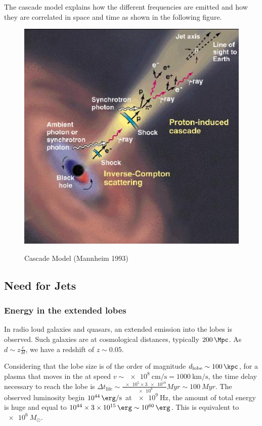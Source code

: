 \documentclass[10pt,a4paper,english]{article}
\begin{document}
The cascade model explains how the different frequencies are emitted and how
they are correlated in space and time as shown in the following figure.

\begin{figure}[!ht]
  \begin{center}
    \includegraphics{figures/Mannheim1993.jpg}
    \label{fig:mannheim1993}
    \caption{Cascade Model (Mannheim 1993)}
  \end{center}
\end{figure}


\subsection{Need for Jets}

\subsubsection{Energy in the extended lobes}

In radio loud galaxies and quasars, an extended emission into the lobes is
observed. Such galaxies are at cosmological distances, typically
$\SI{200}{\Mpc}$. As $d\sim z\frac{c }{H}$, we have a redshift of $z\sim 0.05$.

Considering that the lobe size is of the order of magnitude
$d_\mathrm{lobe}\sim \SI{100}{\kpc}$, for a plasma that moves in the at speed
$v\sim \SI{e8}{\cm\per\s} = \SI{1000}{\km\per\s}$, the time delay necessary to
reach the lobe is $\Delta t_\mathrm{life} \sim
\frac{\num{e5}\times\num{3e18}}{\num{e8}} \si{Myr} \sim \SI{100}{Myr}$. The
observed luminosity begin $\SI{e44}{\erg\per\s}$ at $\SI{e9}{\Hz}$, the amount
of total energy is huge and equal to $\num{e44}\times\SI{3e15}{\erg} \sim
\SI{e60}{\erg}$. This is equivalent to $\SI{e6}{M_\odot}$.
\end{document}
